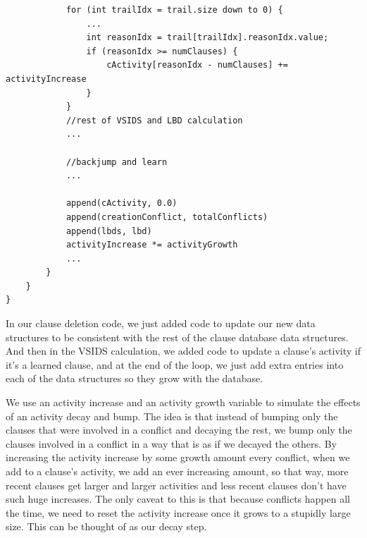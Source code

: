 \documentclass[../main.tex]{subfiles}
\begin{document}
\begin{lstlisting}
            for (int trailIdx = trail.size down to 0) {
                ...
                int reasonIdx = trail[trailIdx].reasonIdx.value;
                if (reasonIdx >= numClauses) {
                    cActivity[reasonIdx - numClauses] += activityIncrease
                }
            }
            //rest of VSIDS and LBD calculation
            ...

            //backjump and learn 
            ... 

            append(cActivity, 0.0)
            append(creationConflict, totalConflicts)
            append(lbds, lbd)
            activityIncrease *= activityGrowth
            ...
        }
    }
}
\end{lstlisting}
\noindent
In our clause deletion code, we just added code to update our new data structures
to be consistent with the rest of the clause database data structures. And then 
in the VSIDS calculation, we added code to update a clause's activity if it's 
a learned clause, and at the end of the loop, we just add extra entries into each 
of the data structures so they grow with the database. 

We use an activity increase and an activity growth variable to simulate the effects 
of an activity decay and bump. The idea is that instead of bumping only the clauses 
that were involved in a conflict and decaying the rest, we bump only the clauses 
involved in a conflict in a way that is as if we decayed the others. By increasing 
the activity increase by some growth amount every conflict, when we add to a clause's 
activity, we add an ever increasing amount, so that way, more recent clauses get 
larger and larger activities and less recent clauses don't have such huge increases. 
The only caveat to this is that because conflicts happen all the time, we need to 
reset the activity increase once it grows to a stupidly large size. This can be thought 
of as our decay step.
\end{document}
